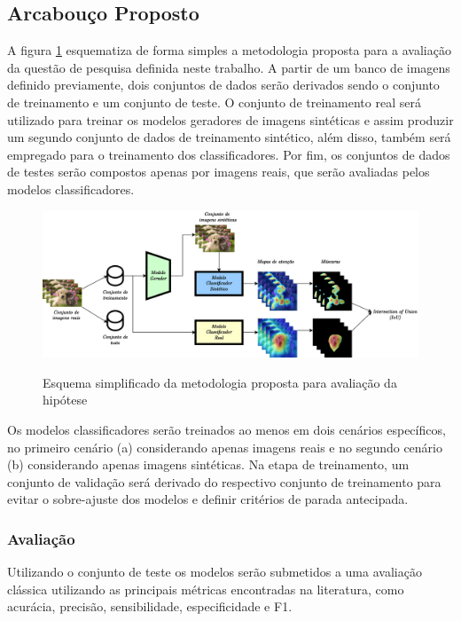 \subsection{Arcabouço Proposto} \label{secao:arcabouco}

A figura \ref{fig:arcabouco} esquematiza de forma simples a metodologia proposta para a avaliação da questão de pesquisa definida neste trabalho.
A partir de um banco de imagens definido previamente, dois conjuntos de dados serão derivados sendo o conjunto de treinamento e um conjunto de teste. O conjunto de treinamento real será utilizado para treinar os modelos geradores de imagens sintéticas e assim produzir um segundo conjunto de dados de treinamento sintético, além disso, também será empregado para o treinamento dos classificadores. Por fim, os conjuntos de dados de testes serão compostos apenas por imagens reais, que serão avaliadas pelos modelos classificadores.

\begin{figure}[htbp]
	\centering
	\caption{Esquema simplificado da metodologia proposta para avaliação da hipótese}
		\includegraphics[scale=.65]{imagens/arcabouco.png}
	\label{fig:arcabouco}
\end{figure}

Os modelos classificadores serão treinados ao menos em dois cenários específicos, no primeiro cenário (a) considerando apenas imagens reais e no segundo cenário (b) considerando apenas imagens sintéticas. Na etapa de treinamento, um conjunto de validação será derivado do respectivo conjunto de treinamento para evitar o sobre-ajuste dos modelos e definir critérios de parada antecipada.

\subsubsection{Avaliação}

Utilizando o conjunto de teste os modelos serão submetidos a uma avaliação clássica utilizando as principais métricas encontradas na literatura, como acurácia, precisão, sensibilidade, especificidade e F1.

